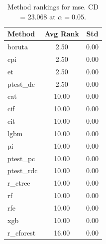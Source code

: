 \begin{table}[h]
\centering
\caption{Method rankings for mse. CD = 23.068 at $\alpha=0.05$.}
\label{tab:ranks_mse}
\begin{tabular}{lcc}
\toprule
Method & Avg Rank & Std \\
\midrule
boruta & 2.50 & 0.00 \\
cpi & 2.50 & 0.00 \\
et & 2.50 & 0.00 \\
ptest_dc & 2.50 & 0.00 \\
cat & 10.00 & 0.00 \\
cif & 10.00 & 0.00 \\
cit & 10.00 & 0.00 \\
lgbm & 10.00 & 0.00 \\
pi & 10.00 & 0.00 \\
ptest_pc & 10.00 & 0.00 \\
ptest_rdc & 10.00 & 0.00 \\
r_ctree & 10.00 & 0.00 \\
rf & 10.00 & 0.00 \\
rfe & 10.00 & 0.00 \\
xgb & 10.00 & 0.00 \\
r_cforest & 16.00 & 0.00 \\
\bottomrule
\end{tabular}
\end{table}